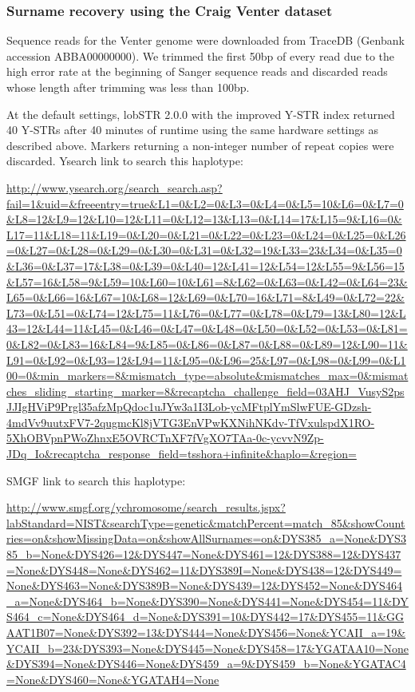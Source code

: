\subsubsection{Surname recovery using the Craig Venter dataset}
Sequence reads for the Venter genome were downloaded from TraceDB (Genbank accession ABBA00000000). We trimmed the first 50bp of every read due to the high error rate at the beginning of Sanger sequence reads and discarded reads whose length after trimming was less than 100bp. 

At the default settings, lobSTR 2.0.0 with the improved Y-STR index returned 40 Y-STRs after 40 minutes of runtime using the same hardware settings as described above. Markers returning a non-integer number of repeat copies were discarded. 
Ysearch link to search this haplotype:

\url{http://www.ysearch.org/search_search.asp?fail=1&uid=&freeentry=true&L1=0&L2=0&L3=0&L4=0&L5=10&L6=0&L7=0&L8=12&L9=12&L10=12&L11=0&L12=13&L13=0&L14=17&L15=9&L16=0&L17=11&L18=11&L19=0&L20=0&L21=0&L22=0&L23=0&L24=0&L25=0&L26=0&L27=0&L28=0&L29=0&L30=0&L31=0&L32=19&L33=23&L34=0&L35=0&L36=0&L37=17&L38=0&L39=0&L40=12&L41=12&L54=12&L55=9&L56=15&L57=16&L58=9&L59=10&L60=10&L61=8&L62=0&L63=0&L42=0&L64=23&L65=0&L66=16&L67=10&L68=12&L69=0&L70=16&L71=8&L49=0&L72=22&L73=0&L51=0&L74=12&L75=11&L76=0&L77=0&L78=0&L79=13&L80=12&L43=12&L44=11&L45=0&L46=0&L47=0&L48=0&L50=0&L52=0&L53=0&L81=0&L82=0&L83=16&L84=9&L85=0&L86=0&L87=0&L88=0&L89=12&L90=11&L91=0&L92=0&L93=12&L94=11&L95=0&L96=25&L97=0&L98=0&L99=0&L100=0&min_markers=8&mismatch_type=absolute&mismatches_max=0&mismatches_sliding_starting_marker=8&recaptcha_challenge_field=03AHJ_VusyS2psJJIgHViP9Prgl35afzMpQdoc1uJYw3a1I3Lob-ycMFtplYmSlwFUE-GDzsh-4mdVv9uutxFV7-2qugmcKl8jVTG3EnVPwKXNihNKdv-TfVxulspdX1RO-5XhOBVpnPWoZhnxE5OVRCTnXF7fVgXO7TAa-0c-ycvvN9Zp-JDq_Io&recaptcha_response_field=tsshora+infinite&haplo=&region=}

SMGF link to search this haplotype:

\url{http://www.smgf.org/ychromosome/search_results.jspx?labStandard=NIST&searchType=genetic&matchPercent=match_85&showCountries=on&showMissingData=on&showAllSurnames=on&DYS385_a=None&DYS385_b=None&DYS426=12&DYS447=None&DYS461=12&DYS388=12&DYS437=None&DYS448=None&DYS462=11&DYS389I=None&DYS438=12&DYS449=None&DYS463=None&DYS389B=None&DYS439=12&DYS452=None&DYS464_a=None&DYS464_b=None&DYS390=None&DYS441=None&DYS454=11&DYS464_c=None&DYS464_d=None&DYS391=10&DYS442=17&DYS455=11&GGAAT1B07=None&DYS392=13&DYS444=None&DYS456=None&YCAII_a=19&YCAII_b=23&DYS393=None&DYS445=None&DYS458=17&YGATAA10=None&DYS394=None&DYS446=None&DYS459_a=9&DYS459_b=None&YGATAC4=None&DYS460=None&YGATAH4=None}

